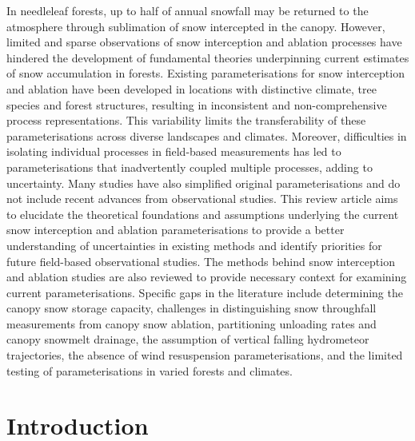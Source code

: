 \documentclass[
  letterpaper,
]{tex/uofsthesis-cs}
\begin{document}
In needleleaf forests, up to half of annual snowfall may be returned to
the atmosphere through sublimation of snow intercepted in the canopy.
However, limited and sparse observations of snow interception and
ablation processes have hindered the development of fundamental theories
underpinning current estimates of snow accumulation in forests. Existing
parameterisations for snow interception and ablation have been developed
in locations with distinctive climate, tree species and forest
structures, resulting in inconsistent and non-comprehensive process
representations. This variability limits the transferability of these
parameterisations across diverse landscapes and climates. Moreover,
difficulties in isolating individual processes in field-based
measurements has led to parameterisations that inadvertently coupled
multiple processes, adding to uncertainty. Many studies have also
simplified original parameterisations and do not include recent advances
from observational studies. This review article aims to elucidate the
theoretical foundations and assumptions underlying the current snow
interception and ablation parameterisations to provide a better
understanding of uncertainties in existing methods and identify
priorities for future field-based observational studies. The methods
behind snow interception and ablation studies are also reviewed to
provide necessary context for examining current parameterisations.
Specific gaps in the literature include determining the canopy snow
storage capacity, challenges in distinguishing snow throughfall
measurements from canopy snow ablation, partitioning unloading rates and
canopy snowmelt drainage, the assumption of vertical falling hydrometeor
trajectories, the absence of wind resuspension parameterisations, and
the limited testing of parameterisations in varied forests and climates.

\section{Introduction}\label{introduction-1}
\end{document}
